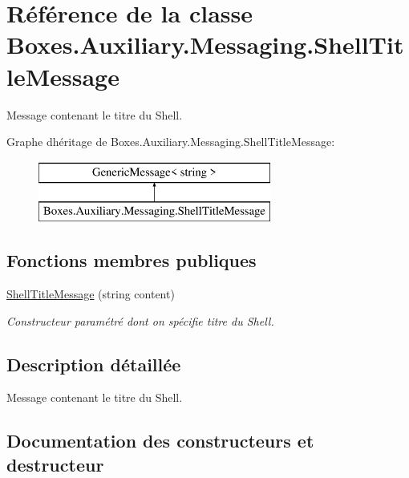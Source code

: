 \hypertarget{class_boxes_1_1_auxiliary_1_1_messaging_1_1_shell_title_message}{}\section{Référence de la classe Boxes.\+Auxiliary.\+Messaging.\+Shell\+Title\+Message}
\label{class_boxes_1_1_auxiliary_1_1_messaging_1_1_shell_title_message}


Message contenant le titre du Shell.  


Graphe d\textquotesingle{}héritage de Boxes.\+Auxiliary.\+Messaging.\+Shell\+Title\+Message\+:\begin{figure}[H]
\begin{center}
\leavevmode
\includegraphics[height=2.000000cm]{class_boxes_1_1_auxiliary_1_1_messaging_1_1_shell_title_message}
\end{center}
\end{figure}
\subsection*{Fonctions membres publiques}
\begin{DoxyCompactItemize}
\item 
\hyperlink{class_boxes_1_1_auxiliary_1_1_messaging_1_1_shell_title_message_a2a31731ad00f37c552cf2abd5895ae44}{Shell\+Title\+Message} (string content)
\begin{DoxyCompactList}\small\item\em Constructeur paramétré dont on spécifie titre du Shell. \end{DoxyCompactList}\end{DoxyCompactItemize}


\subsection{Description détaillée}
Message contenant le titre du Shell. 



\subsection{Documentation des constructeurs et destructeur}
